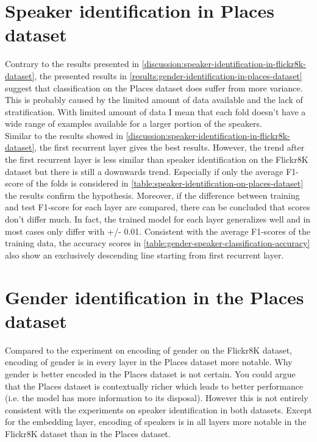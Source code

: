 \documentclass[a4paper, oneside]{book}
\begin{document}
\section{Speaker identification in Places dataset}\label{discussion:speaker-identification-in-places-dataset}

Contrary to the results presented in \autoref{discussion:speaker-identification-in-flickr8k-dataset}, the presented results in  \autoref{results:gender-identification-in-places-dataset} suggest that classification on the Places dataset does suffer from more variance. This is probably caused by the limited amount of data available and the lack of stratification. With limited amount of data I mean that each fold doesn’t have a wide range of examples available for a larger portion of the speakers. \\

Similar to the results showed in \autoref{discussion:speaker-identification-in-flickr8k-dataset}, the first recurrent layer gives the best results. However, the trend after the first recurrent layer is less similar than speaker identification on the Flickr8K dataset but there is still a downwards trend. Especially if only the average F1-score of the folds is considered in \autoref{table:speaker-identification-on-places-dataset} the results confirm the hypothesis. Moreover, if the difference between training and test F1-score for each layer are compared, there can be concluded that scores don’t differ much. In fact, the trained model for each layer generalizes well and in most cases only differ with +/- 0.01. Consistent with the average F1-scores of the training data, the accuracy scores in \autoref{table:gender-speaker-classification-accuracy} also show an exclusively descending line starting from first recurrent layer.

\section{Gender identification in the Places dataset}\label{dicussion:gender-identification-in-places-dataset}

Compared to the experiment on encoding of gender on the Flickr8K dataset, encoding of gender is in every layer in the Places dataset more notable. Why gender is better encoded in the Places dataset is not certain. You could argue that the Places dataset is contextually richer which leads to better performance (i.e. the model has more information to its disposal). However this is not entirely consistent with the experiments on speaker identification in both datasets. Except for the embedding layer, encoding of speakers is in all layers more notable in the Flickr8K dataset than in the Places dataset. \\
\end{document}

